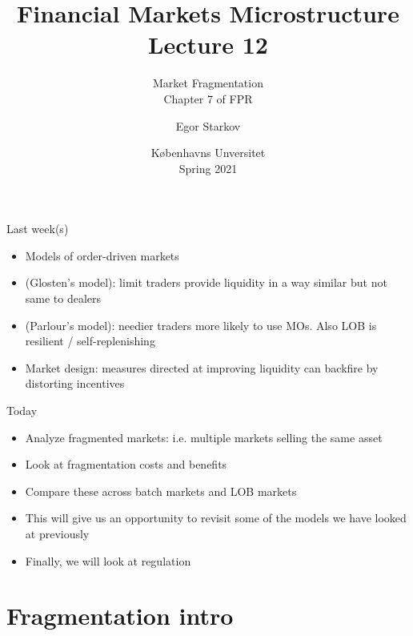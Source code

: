 \documentclass[english,10pt
,aspectratio=169
]{beamer}
\title{Financial Markets Microstructure \\ Lecture 12}
\subtitle{Market Fragmentation\\
	Chapter 7 of FPR}
\author{Egor Starkov}
\date{K{\o}benhavns Unversitet \\
	Spring 2021}
\begin{document}
\frame[plain]{\titlepage}


\begin{frame}{Last week(s)}
	\begin{itemize}
		\item Models of order-driven markets
		\item (Glosten's model): limit traders provide liquidity in a way similar but not same to dealers
		\item (Parlour's model): needier traders more likely to use MOs. Also LOB is resilient / self-replenishing
		\item Market design: measures directed at improving liquidity can backfire by distorting incentives
	\end{itemize}
\end{frame}


\begin{frame}{Today}
	\begin{itemize}
		\item Analyze fragmented markets: i.e. multiple markets selling the same asset
		\item Look at fragmentation costs and benefits
		\item Compare these across batch markets and LOB markets
		\item This will give us an opportunity to revisit some of the models we have looked at previously
		\item Finally, we will look at regulation
	\end{itemize}
\end{frame}



\section{Fragmentation intro}
\end{document}
